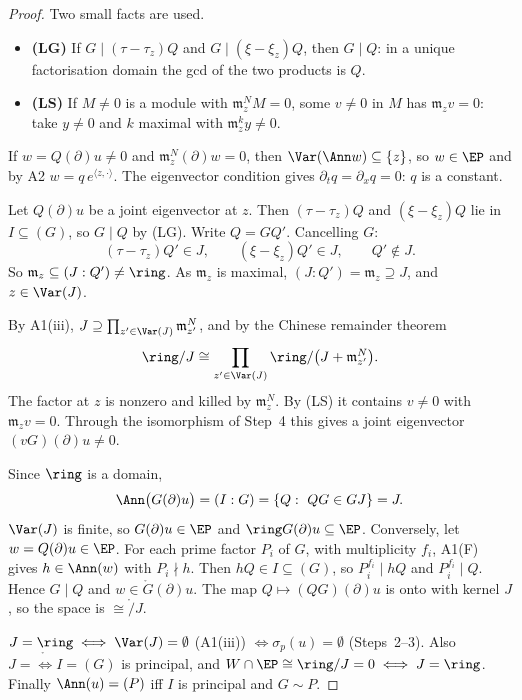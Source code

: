 \begin{proof}
Two small facts are used.
\begin{itemize}
\item \textbf{(LG)} If $G\mid(\tau-\tau_z)Q$ and $G\mid(\xi-\xi_z)Q$, then $G\mid Q$: in a unique factorisation domain the gcd of the two products is $Q$.
\item \textbf{(LS)} If $M\ne0$ is a module with $\mathfrak m_z^NM=0$, some $v\ne0$ in $M$ has $\mathfrak m_zv=0$: take $y\ne0$ and $k$ maximal with $\mathfrak m_z^ky\ne0$.
\end{itemize}

If $w=Q(\partial)u\ne0$ and $\mathfrak m_z^N(\partial)w=0$, then $\Var(\Ann w)\subseteq\{z\}$, so $w\in\EP$ and by A2 $w=q\,e^{\langle z,\cdot\rangle}$. The eigenvector condition gives $\partial_tq=\partial_xq=0$: $q$ is a constant.

Let $Q(\partial)u$ be a joint eigenvector at $z$. Then $(\tau-\tau_z)Q$ and $(\xi-\xi_z)Q$ lie in $I\subseteq(G)$, so $G\mid Q$ by (LG). Write $Q=GQ'$. Cancelling $G$:
\[
(\tau-\tau_z)Q'\in J,\qquad (\xi-\xi_z)Q'\in J,\qquad Q'\notin J .
\]
So $\mathfrak m_z\subseteq(J:Q')\ne\ring$. As $\mathfrak m_z$ is maximal, $(J:Q')=\mathfrak m_z\supseteq J$, and $z\in\Var(J)$.

By A1(iii), $J\supseteq\prod_{z'\in\Var(J)}\mathfrak m_{z'}^N$, and by the Chinese remainder theorem
\[
\ring/J\cong\prod_{z'\in\Var(J)}\ring/\big(J+\mathfrak m_{z'}^N\big).
\]
The factor at $z$ is nonzero and killed by $\mathfrak m_z^N$. By (LS) it contains $v\ne0$ with $\mathfrak m_zv=0$. Through the isomorphism of Step~4 this gives a joint eigenvector $(vG)(\partial)u\ne0$.

Since $\ring$ is a domain,
\[
\Ann\big(G(\partial)u\big)=(I:G)=\{Q:\ QG\in GJ\}=J .
\]
$\Var(J)$ is finite, so $G(\partial)u\in\EP$ and $\ring G(\partial)u\subseteq\EP$. Conversely, let $w=Q(\partial)u\in\EP$. For each prime factor $P_i$ of $G$, with multiplicity $f_i$, A1(F) gives $h\in\Ann(w)$ with $P_i\nmid h$. Then $hQ\in I\subseteq(G)$, so $P_i^{f_i}\mid hQ$ and $P_i^{f_i}\mid Q$. Hence $G\mid Q$ and $w\in\ring G(\partial)u$. The map $Q\mapsto(QG)(\partial)u$ is onto with kernel $J$, so the space is $\cong\ring/J$.

$J=\ring\iff\Var(J)=\emptyset$ (A1(iii)) $\iff\sigma_p(u)=\emptyset$ (Steps~2--3). Also $J=\ring\iff I=(G)$ is principal, and $W\cap\EP\cong\ring/J=0\iff J=\ring$. Finally $\Ann(u)=(P)$ iff $I$ is principal and $G\sim P$.

\end{proof}

